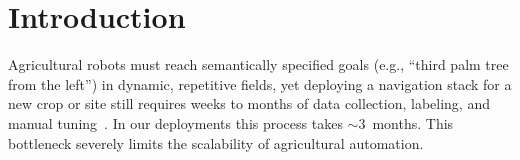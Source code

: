 \documentclass{article}
\begin{document}






\section{Introduction}
\label{sec:intro}

Agricultural robots must reach semantically specified goals (e.g., ``third palm tree from the left'') in dynamic, repetitive fields, yet deploying a navigation stack for a new crop or site still requires weeks to months of data collection, labeling, and manual tuning~\citep{bac2014harvesting}. In our deployments this process takes ${\sim}$3~months. This bottleneck severely limits the scalability of agricultural automation.
\end{document}
